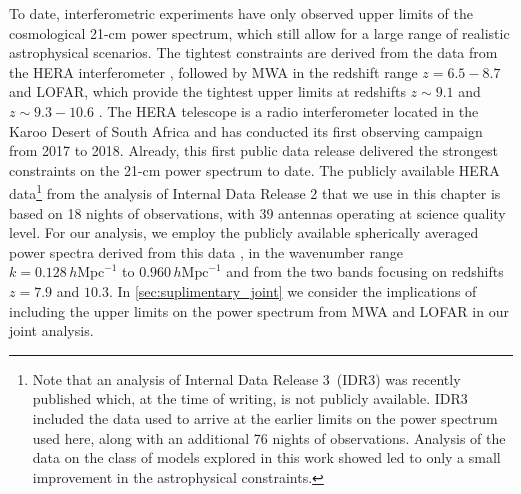 To date, interferometric experiments have only observed upper limits of the cosmological 21-cm power spectrum, which still allow for a large range of realistic astrophysical scenarios. The tightest constraints are derived from the data from the HERA interferometer \cite{HERA_2022a}, followed by MWA in the redshift range $z = 6.5 - 8.7$ \cite{Trott_mwa_2020} and LOFAR, which provide the tightest upper limits at redshifts $z \sim 9.1$ \cite{Patil_2017} and $z \sim 9.3 - 10.6$ \cite{Mertens_2020}. The HERA telescope is a radio interferometer located in the Karoo Desert of South Africa \cite{HERA_2017} and has conducted its first observing campaign from 2017 to 2018. Already, this first public data release delivered the strongest constraints on the 21-cm power spectrum to date. The publicly available HERA data\footnote{Note that an analysis of Internal Data Release 3~(IDR3) was recently published \cite{HERA_2022c} which, at the time of writing, is not publicly available. IDR3 included the data used to arrive at the earlier limits on the power spectrum\cite{HERA_2022b} used here, along with an additional 76 nights of observations. Analysis of the data on the class of models explored in this work showed led to only a small improvement in the astrophysical constraints.} from the analysis of Internal Data Release 2 that we use in this chapter is based on 18 nights of observations, with 39 antennas operating at science quality level. For our analysis, we employ the publicly available spherically averaged power spectra derived from this data \cite{HERA_2022a}, in the wavenumber range $k=0.128\,h\mathrm{Mpc}^{-1}$ to $0.960\,h\mathrm{Mpc}^{-1}$ and from the two bands focusing on redshifts $z=7.9$ and $10.3$. In \cref{sec:suplimentary_joint} we consider the implications of including the upper limits on the power spectrum from MWA and LOFAR in our joint analysis.
 
